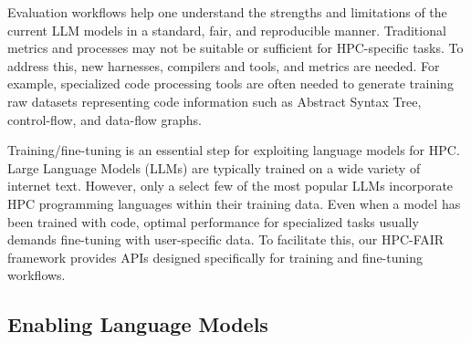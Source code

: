Evaluation workflows help one understand the strengths and limitations of the current LLM models in a standard, fair, and reproducible manner. Traditional metrics and processes may not be suitable or sufficient for HPC-specific tasks. To address this, new harnesses, compilers and tools, and metrics are needed. For example, specialized code processing tools are often needed to generate training raw datasets representing code information such as Abstract Syntax Tree, control-flow, and data-flow graphs.

Training/fine-tuning is an essential step for exploiting language models for HPC. Large Language Models (LLMs) are typically trained on a wide variety of internet text. However, only a select few of the most popular LLMs incorporate HPC programming languages within their training data. Even when a model has been trained with code, optimal performance for specialized tasks usually demands fine-tuning with user-specific data. To facilitate this, our HPC-FAIR framework provides APIs designed specifically for training and fine-tuning workflows.


\subsection{Enabling Language Models}

